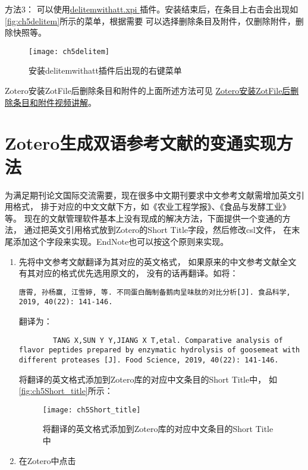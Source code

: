 \documentclass[theorem=false,mathfont=none,openany,sub3section]{easybook}
\begin{document}
{方法3：
可以使用\href{https://github.com/redleafnew/delitemwithatt/releases}{delitemwithatt.xpi
}插件。安装结束后，在条目上右击会出现如\autoref{fig:ch5delitem}所示的菜单，根据需要
可以选择删除条目及附件，仅删除附件，删除快照等。


\begin{figure}[ht]
	\centering
	\texttt{[image: ch5delitem]}
	\caption{安装delitemwithatt插件后出现的右键菜单}
	\label{fig:ch5delitem}
\end{figure}

Zotero安装ZotFile后删除条目和附件的上面所述方法可见
\href{https://zhuanlan.zhihu.com/p/369141058}{Zotero安装ZotFile后删除条目和附件视频讲解}。

\section{Zotero生成双语参考文献的变通实现方法}\label{sec:Biolan}
为满足期刊论文国际交流需要，现在很多中文期刊要求中文参考文献需增加英文引用格式，
排于对应的中文文献下方，如《农业工程学报》、《食品与发酵工业》等。
现在的文献管理软件基本上没有现成的解决方法，下面提供一个变通的方法，
通过把英文引用格式放到Zotero的Short Title字段，然后修改csl文件，
在末尾添加这个字段来实现。EndNote也可以按这个原则来实现。
\begin{enumerate}
	\item 先将中文参考文献翻译为其对应的英文格式，
	如果原来的中文参考文献全文有其对应的格式优先选用原文的，
	没有的话再翻译。如将：
	\begin{lstlisting}[language=VBScript]
		唐霄, 孙杨赢, 江雪婷, 等. 不同蛋白酶制备鹅肉呈味肽的对比分析[J]. 食品科学, 2019, 40(22): 141-146.
	\end{lstlisting}
	翻译为：
	\begin{lstlisting}
		TANG X,SUN Y Y,JIANG X T,etal. Comparative analysis of flavor peptides prepared by enzymatic hydrolysis of goosemeat with different proteases [J]. Food Science, 2019, 40(22): 141-146.
	\end{lstlisting}
	将翻译的英文格式添加到Zotero库的对应中文条目的Short Title中，
	如\autoref{fig:ch5Short_title}所示：
	\begin{figure}[ht]
		\centering
		\texttt{[image: ch5Short\_title]}
		\caption{将翻译的英文格式添加到Zotero库的对应中文条目的Short Title中}
		\label{fig:ch5Short_title}
	\end{figure}
	\item 在Zotero中点击
\end{enumerate}}
\end{document}
